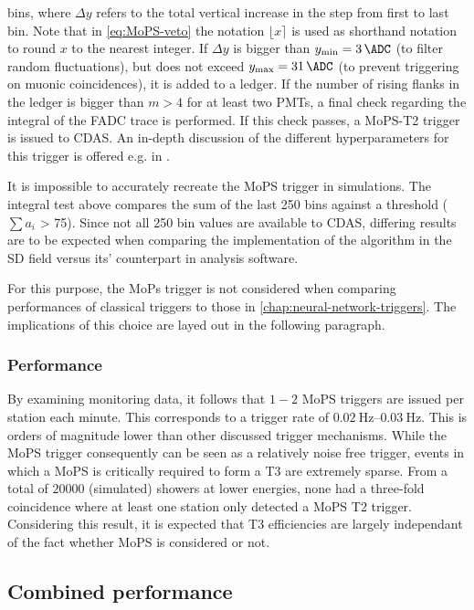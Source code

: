 bins, where $\Delta y$ refers to the total vertical increase in the step from first to last bin. Note that in \autoref{eq:MoPS-veto} the notation 
$\lfloor x \rceil$ is used as shorthand notation to round $x$ to the nearest integer. If $\Delta y$ is bigger than $y_\text{min} = \SI{3}{\ADC}$ (to filter random 
fluctuations), but does not exceed $y_\text{max} = \SI{31}{\ADC}$ (to prevent triggering on muonic coincidences), it is added to a ledger. If the number of rising 
flanks in the ledger is bigger than $m>4$ for at least two PMTs, a final check regarding the integral of the FADC trace is performed. If this check passes, a 
MoPS-T2 trigger is issued to CDAS. An in-depth discussion of the different hyperparameters for this trigger is offered e.g. in \cite{gapMoPS}.

It is impossible to accurately recreate the MoPS trigger in simulations. The integral test above compares the sum of the last 250 bins against a threshold 
($\sum a_i$ > 75). Since not all 250 bin values are available to CDAS, differing results are to be expected when comparing the implementation of the algorithm in 
the SD field versus its' counterpart in analysis software. 

For this purpose, the MoPs trigger is not considered when comparing performances of classical triggers to those in \autoref{chap:neural-network-triggers}. The 
implications of this choice are layed out in the following paragraph.

\subsubsection{Performance}
\label{ssec:mops-performance}

By examining monitoring data, it follows that $1-2$ MoPS triggers are issued per station each minute. This corresponds to a trigger rate of 
$\SIrange[range-phrase = \,\text{to}\,]{0.02}{0.03}{\hertz}$. This is orders of magnitude lower than other discussed trigger mechanisms. While the MoPS trigger 
consequently can be seen as a relatively noise free trigger, events in which a MoPS is critically required to form a T3 are extremely sparse. From a total of 
$20000$ (simulated) showers at lower energies, none had a three-fold coincidence where at least one station only detected a MoPS T2 trigger. Considering this 
result, it is expected that T3 efficiencies are largely independant of the fact whether MoPS is considered or not.

\subsection{Combined performance}
\label{ssec:combined-performance}

